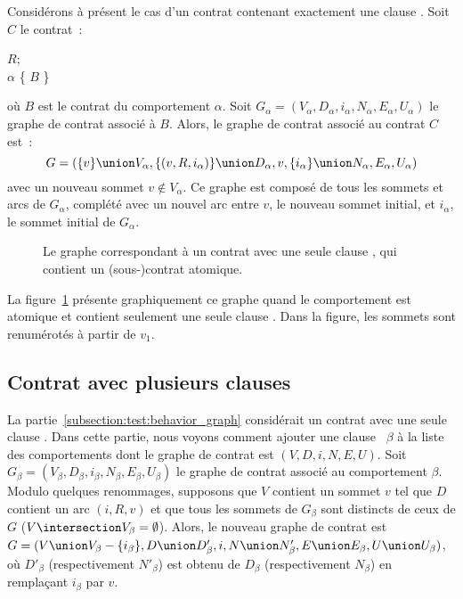 Considérons à présent le cas d'un contrat contenant exactement une clause
\abehavior. Soit $C$ le contrat~:
%
\begin{pre}
\arequires \(R\); \\
\abehavior \(\alpha\) \{ \(B\) \}
\end{pre}
%
où $B$ est le contrat du comportement $\alpha$. Soit $G_\alpha = (V_\alpha,
D_\alpha, i_\alpha, N_\alpha, E_\alpha, U_\alpha)$ le graphe de contrat associé
à $B$. Alors, le graphe de contrat associé au contrat $C$ est~:
%
$$G = (
  \{v\} \union V_\alpha,
  \{(v, R, i_\alpha)\} \union D_\alpha,
  v,
  \{i_\alpha\} \union N_\alpha,
  E_\alpha,
  U_\alpha
)$$
%
avec un nouveau sommet $v \notin V_\alpha$. Ce graphe est composé de tous les
sommets et arcs de $G_\alpha$, complété avec un nouvel arc entre $v$, le nouveau
sommet initial, et $i_\alpha$, le sommet initial de $G_\alpha$.

\begin{figure}


\caption{\label{figure:test:behavior_graph} Le graphe correspondant à un contrat
avec une seule clause \abehavior, qui contient un (sous-)contrat atomique.}

\end{figure}

La figure~\ref{figure:test:behavior_graph} présente graphiquement ce graphe
quand le comportement est atomique et contient seulement une seule clause
. Dans la figure, les
sommets sont renumérotés à partir de $v_1$.

\subsection{Contrat avec plusieurs clauses \abehavior}
\label{subsection:test:behaviors_graph}

La partie~\ref{subsection:test:behavior_graph} considérait un contrat avec une
seule clause \abehavior. Dans cette partie, nous voyons comment ajouter une
clause \abehavior~$\beta$ à la liste des comportements dont le graphe de contrat
est $(V, D, i, N, E, U)$. Soit $G_\beta = (V_\beta, D_\beta, i_\beta, N_\beta,
E_\beta, U_\beta)$ le graphe de contrat associé au comportement $\beta$. Modulo
quelques renommages, supposons que $V$ contient un sommet $v$ tel que $D$
contient un arc $(i, R, v)$ et que tous les sommets de $G_\beta$ sont distincts
de ceux de $G$ ($V \intersection V_\beta = \emptyset$). Alors, le nouveau graphe
de contrat est $G = (V \union V_\beta - \{i_\beta\}, D \union D'_\beta, i, N
\union N'_\beta, E \union E_\beta, U \union U_\beta)$, où $D'_\beta$
(respectivement $N'_\beta$) est obtenu de $D_\beta$ (respectivement $N_\beta$)
en remplaçant $i_\beta$ par $v$.

